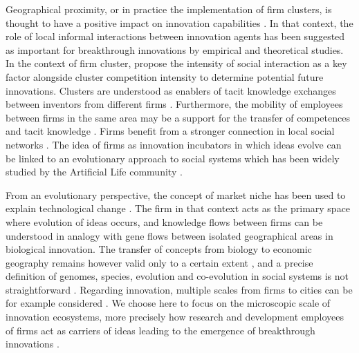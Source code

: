 \documentclass[letterpaper]{article}
\begin{document}
Geographical proximity, or in practice the implementation of firm clusters, is thought to have a positive impact on innovation capabilities \citep{bittencourt2019cluster}. In that context, the role of local informal interactions between innovation agents has been suggested as important for breakthrough innovations by empirical and theoretical studies. In the context of firm cluster, \cite{gnyawali2013complementary} propose the intensity of social interaction as a key factor alongside cluster competition intensity to determine potential future innovations. Clusters are understood as enablers of tacit knowledge exchanges between inventors from different firms \citep{arikan2009interfirm}. Furthermore, the mobility of employees between firms in the same area may be a support for the transfer of competences and tacit knowledge \citep{almeida1999localization}. Firms benefit from a stronger connection in local social networks \citep{kemeny2016economic}. The idea of firms as innovation incubators in which ideas evolve can be linked to an evolutionary approach to social systems which has been widely studied by the Artificial Life community \citep{marriott2018social}.

From an evolutionary perspective, the concept of market niche has been used to explain technological change \citep{schot2007niches}. The firm in that context acts as the primary space where evolution of ideas occurs, and knowledge flows between firms can be understood in analogy with gene flows between isolated geographical areas in biological innovation. The transfer of concepts from biology to economic geography remains however valid only to a certain extent \citep{schamp2010notion}, and a precise definition of genomes, species, evolution and co-evolution in social systems is not straightforward \citep{raimbault2019modeling}. Regarding innovation, multiple scales from firms to cities can be for example considered \citep{raimbault2020model}. We choose here to focus on the microscopic scale of innovation ecosystems, more precisely how research and development employees of firms act as carriers of ideas leading to the emergence of breakthrough innovations \citep{song2016innovation}.
\end{document}
